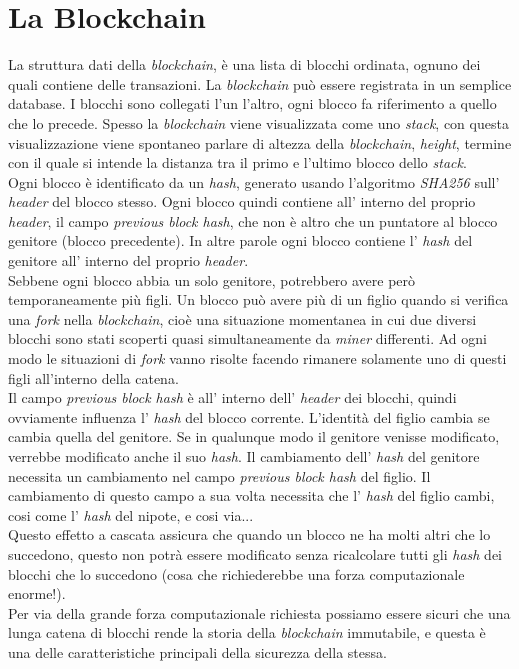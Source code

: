 \section{La Blockchain}
La struttura dati della \textit{blockchain}, \`e una lista di blocchi ordinata, ognuno dei quali contiene delle transazioni. La \textit{blockchain} pu\`o essere registrata in un semplice database. I blocchi sono collegati l'un l'altro, ogni blocco fa riferimento a quello che lo precede. Spesso la \textit{blockchain} viene visualizzata come uno \textit{stack}, con questa visualizzazione viene spontaneo parlare di altezza della \textit{blockchain}, \textit{height}, termine con il quale si intende la distanza tra il primo e l'ultimo blocco dello \textit{stack}.\\
Ogni blocco \`e identificato da un \textit{hash}, generato usando l'algoritmo \textit{SHA256} sull' \textit{header} del blocco stesso. Ogni blocco quindi contiene all' interno del proprio \textit{header}, il campo \textit{previous block hash}, che non \`e altro che un puntatore al blocco genitore (blocco precedente). In altre parole ogni blocco contiene l' \textit{hash} del genitore all' interno del proprio \textit{header}.\\
Sebbene ogni blocco abbia un solo genitore, potrebbero avere per\`o temporaneamente pi\`u figli. Un blocco pu\`o avere pi\`u di un figlio quando si verifica una \textit{fork} nella \textit{blockchain}, cio\`e una situazione momentanea in cui due diversi blocchi sono stati scoperti quasi simultaneamente da \textit{miner} differenti. Ad ogni modo le situazioni di \textit{fork} vanno risolte facendo rimanere solamente uno di questi figli all'interno della catena.\\
Il campo \textit{previous block hash} \`e all' interno dell' \textit{header} dei blocchi, quindi ovviamente influenza l' \textit{hash} del blocco corrente. L'identit\`a del figlio cambia se cambia quella del genitore. Se in qualunque modo il genitore venisse modificato, verrebbe modificato anche il suo \textit{hash}. Il cambiamento dell' \textit{hash} del genitore necessita un cambiamento nel campo \textit{previous block hash} del figlio. Il cambiamento di questo campo a sua volta necessita che l' \textit{hash} del figlio cambi, cosi come l' \textit{hash} del nipote, e cosi via...\\
Questo effetto a cascata assicura che quando un blocco ne ha molti altri che lo succedono, questo non potr\`a essere modificato senza ricalcolare tutti gli \textit{hash} dei blocchi che lo succedono (cosa che richiederebbe una forza computazionale enorme!).\\
Per via della grande forza computazionale richiesta possiamo essere sicuri che una lunga catena di blocchi rende la storia della \textit{blockchain} immutabile, e questa \`e una delle caratteristiche principali della sicurezza della stessa.


